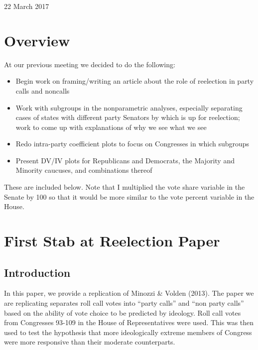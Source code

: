 \documentclass[12pt]{article}
\begin{document}
	
\begin{center}
	\Large 22 March 2017
\end{center}

\section{Overview}

At our previous meeting we decided to do the following:

\begin{itemize}
	\item Begin work on framing/writing an article about the role of reelection in party calls and noncalls
	
	\item Work with subgroups in the nonparametric analyses, especially separating cases of states with different party Senators by which is up for reelection; work to come up with explanations of why we see what we see
	
	\item Redo intra-party coefficient plots to focus on Congresses in which subgroups 
	
	\item Present DV/IV plots for Republicans and Democrats, the Majority and Minority caucuses, and combinations thereof
\end{itemize}

\noindent
These are included below. Note that I multiplied the vote share variable in the Senate by 100 so that it would be more similar to the vote percent variable in the House.

\section{First Stab at Reelection Paper}

\subsection{Introduction}

In this paper, we provide a replication of Minozzi \& Volden (2013). The paper we are replicating separates roll call votes into ``party calls'' and ``non party calls'' based on the ability of vote choice to be predicted by ideology. Roll call votes from Congresses 93-109 in the House of Representatives were used. This was then used to test the hypothesis that more ideologically extreme members of Congress were more responsive than their moderate counterparts.
\end{document}
